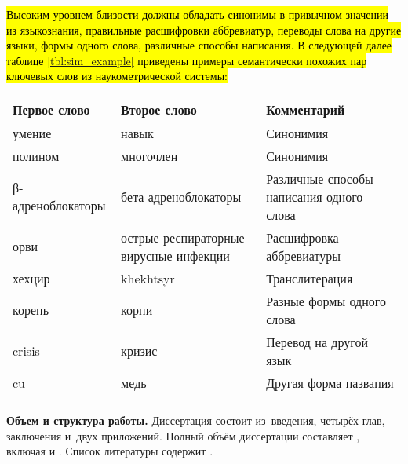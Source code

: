 \hl{Высоким уровнем близости должны обладать синонимы в привычном значении из языкознания, правильные расшифровки аббревиатур, переводы слова на другие языки, формы одного слова, различные способы написания. В следующей далее таблице \ref{tbl:sim_example} приведены примеры семантически похожих пар ключевых слов из наукометрической системы:}
\begin{tabularx}{16cm}{|X|X|X|}
        \hline
        Первое слово & Второе слово & Комментарий \\ \hline
        умение & навык & Синонимия \\ \hline
        полином & многочлен & Синонимия \\ \hline
        β-адреноблокаторы & бета-адреноблокаторы & Различные способы написания одного слова \\ \hline
        орви & острые респираторные вирусные инфекции & Расшифровка аббревиатуры \\ \hline
        хехцир & khekhtsyr & Транслитерация \\ \hline
        корень & корни & Разные формы одного слова \\ \hline
        crisis & кризис & Перевод на другой язык \\ \hline
        cu & медь & Другая форма названия \\ \hline
\caption{Примеры семантически близких ключевых слов} \label{tbl:tuple_test}
        \label{tbl:sim_example}
\end{tabularx}




\newcommand{\actuality}{}
\newcommand{\progress}{}
\newcommand{\aim}{{\textbf\aimTXT}}
\newcommand{\tasks}{\textbf{\tasksTXT} }
\newcommand{\novelty}{\textbf{\noveltyTXT}}
\newcommand{\influence}{\textbf{\influenceTXT}}
\newcommand{\methods}{\textbf{\methodsTXT}}
\newcommand{\defpositions}{\textbf{\defpositionsTXT}}
\newcommand{\reliability}{\textbf{\reliabilityTXT}}
\newcommand{\probation}{\textbf{\probationTXT}}
\newcommand{\contribution}{\textbf{\contributionTXT}}
\newcommand{\publications}{\textbf{\publicationsTXT}}
\newcommand{\workrequirements}{\textbf{\workrequirementsTXT}}



\textbf{Объем и структура работы.} Диссертация состоит из~введения, четырёх глав, заключения и~двух приложений.
%
Полный объём диссертации составляет
, включая
 и
.   Список литературы содержит  
.
